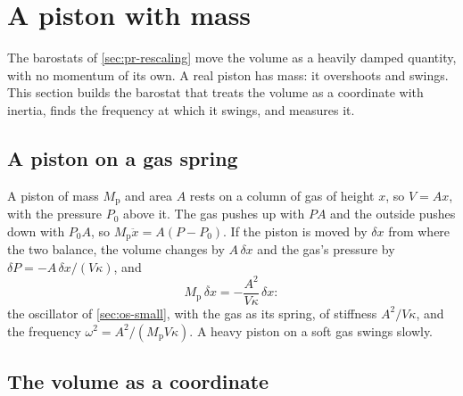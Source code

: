 \section{A piston with mass}
\label{sec:pr-piston}

The barostats of \cref{sec:pr-rescaling} move the volume as a heavily
damped quantity, with no momentum of its own. A real piston has mass: it
overshoots and swings. This section builds the barostat that treats the
volume as a coordinate with inertia, finds the frequency at which it
swings, and measures it.

\subsection*{A piston on a gas spring}

A piston of mass $M_{\mathrm p}$ and area $A$ rests on a column of gas of
height $x$, so $V = Ax$, with the pressure $P_0$ above it. The gas pushes
up with $PA$ and the outside pushes down with $P_0A$, so $M_{\mathrm
p}\ddot x = A(P - P_0)$. If the piston is moved by $\delta x$ from where
the two balance, the volume changes by $A\,\delta x$ and the gas's
pressure by $\delta P = -A\,\delta x/(V\kappa)$, and
\begin{equation*}
   M_{\mathrm p}\,\ddot{\delta x} = -\frac{A^2}{V\kappa}\,\delta x :
\end{equation*}
the oscillator of \cref{sec:os-small}, with the gas as its spring, of
stiffness $A^2/V\kappa$, and the frequency $\omega^2 = A^2/(M_{\mathrm
p}V\kappa)$. A heavy piston on a soft gas swings slowly.

\subsection*{The volume as a coordinate}

